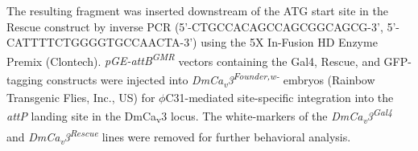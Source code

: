 The resulting fragment was inserted downstream of the ATG start site in the Rescue construct by inverse PCR (5'-CTGCCACAGCCAGCGGCAGCG-3', 5'-CATTTTCTGGGGTGCCAACTA-3') using the 5X In-Fusion HD Enzyme Premix (Clontech).       
\emph{pGE-attB\textsuperscript{GMR}} vectors containing the Gal4, Rescue, and GFP-tagging constructs were injected into \emph{DmCa\textsubscript{v}3\textsuperscript{Founder,w-}} embryos (Rainbow Transgenic Flies, Inc., US) for $\phi$C31-mediated site-specific integration into the \emph{attP} landing site in the DmCa\textsubscript{v}3 locus.
The white-markers of the \emph{DmCa\textsubscript{v}3\textsuperscript{Gal4}} and \emph{DmCa\textsubscript{v}3\textsuperscript{Rescue}} lines were removed for further behavioral analysis.

  
  
  